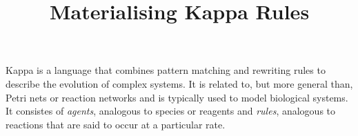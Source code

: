 \documentclass{amsart}
\title{Materialising Kappa Rules}
\begin{document}
\maketitle

Kappa is a language that combines pattern matching and rewriting
rules to describe the evolution of complex systems. It is related to,
but more general than, Petri nets or reaction networks and is
typically used to model biological systems. It consistes of
\emph{agents}, analogous to species or reagents and \emph{rules},
analogous to reactions that are said to occur at a particular
rate.




\end{document}
